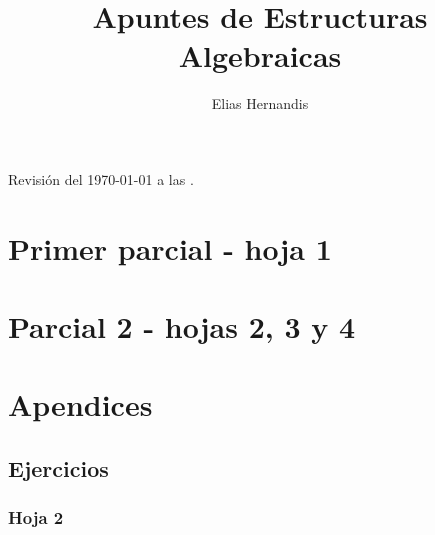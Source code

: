 \documentclass{book}
\title{Apuntes de Estructuras Algebraicas}
\author{Elias Hernandis}
\theoremstyle{definition}
\theoremstyle{remark}
\begin{document}
\maketitle
Revisión del \today $ $ a las \currenttime.

\tableofcontents

\part{Primer parcial - hoja 1}









\part{Parcial 2 - hojas 2, 3 y 4}



	








\part{Apendices}

\chapter{Ejercicios}

\section{Hoja 2}
\end{document}
